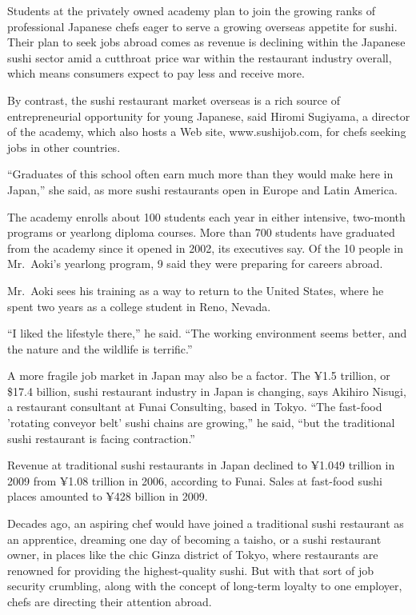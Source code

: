 ﻿\documentclass[12pt]{article}
\begin{document}
Students at the privately owned academy plan to join the growing ranks of professional Japanese
chefs eager to serve a growing overseas appetite for sushi. Their plan to seek jobs abroad comes as
revenue is declining within the Japanese sushi sector amid a cutthroat price war within the
restaurant industry overall, which means consumers expect to pay less and receive more.

By contrast, the sushi restaurant market overseas is a rich source of entrepreneurial opportunity
for young Japanese, said Hiromi Sugiyama, a director of the academy, which also hosts a Web site,
www.sushijob.com, for chefs seeking jobs in other countries.

``Graduates of this school often earn much more than they would make here in Japan,'' she said, as
more sushi restaurants open in Europe and Latin America.

The academy enrolls about 100 students each year in either intensive, two-month programs or yearlong
diploma courses. More than 700 students have graduated from the academy since it opened in 2002, its
executives say. Of the 10 people in Mr.~Aoki's yearlong program, 9 said they were preparing for
careers abroad.

Mr.~Aoki sees his training as a way to return to the United States, where he spent two years as a
college student in Reno, Nevada.

``I liked the lifestyle there,'' he said. ``The working environment seems better, and the nature and
the wildlife is terrific.''

A more fragile job market in Japan may also be a factor. The ¥1.5 trillion, or \$17.4 billion, sushi
restaurant industry in Japan is changing, says Akihiro Nisugi, a restaurant consultant at Funai
Consulting, based in Tokyo. ``The fast-food 'rotating conveyor belt' sushi chains are growing,'' he
said, ``but the traditional sushi restaurant is facing contraction.''

Revenue at traditional sushi restaurants in Japan declined to ¥1.049 trillion in 2009 from ¥1.08
trillion in 2006, according to Funai. Sales at fast-food sushi places amounted to ¥428 billion in
2009.

Decades ago, an aspiring chef would have joined a traditional sushi restaurant as an apprentice,
dreaming one day of becoming a taisho, or a sushi restaurant owner, in places like the chic Ginza
district of Tokyo, where restaurants are renowned for providing the highest-quality sushi. But with
that sort of job security crumbling, along with the concept of long-term loyalty to one employer,
chefs are directing their attention abroad.
\end{document}
